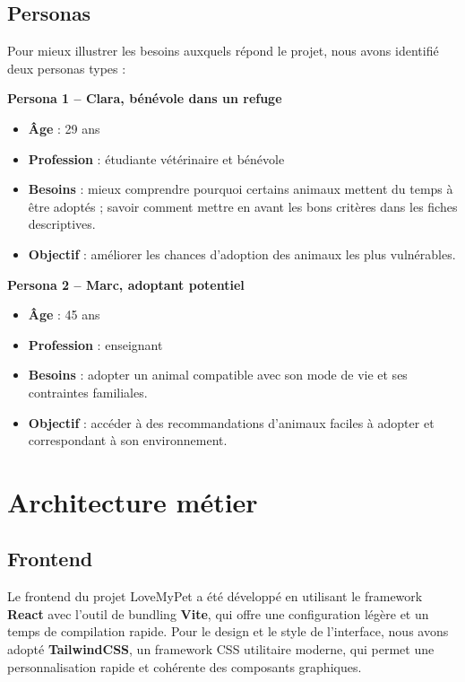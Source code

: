 \documentclass[a4paper,12pt]{article}
\begin{document}
\subsection{Personas}

Pour mieux illustrer les besoins auxquels répond le projet, nous avons identifié deux personas types :

\vspace{1em}
\textbf{Persona 1 – Clara, bénévole dans un refuge}

\begin{itemize}
    \item \textbf{Âge} : 29 ans
    \item \textbf{Profession} : étudiante vétérinaire et bénévole
    \item \textbf{Besoins} : mieux comprendre pourquoi certains animaux mettent du temps à être adoptés ; savoir comment mettre en avant les bons critères dans les fiches descriptives.
    \item \textbf{Objectif} : améliorer les chances d’adoption des animaux les plus vulnérables.
\end{itemize}

\vspace{1em}
\textbf{Persona 2 – Marc, adoptant potentiel}

\begin{itemize}
    \item \textbf{Âge} : 45 ans
    \item \textbf{Profession} : enseignant
    \item \textbf{Besoins} : adopter un animal compatible avec son mode de vie et ses contraintes familiales.
    \item \textbf{Objectif} : accéder à des recommandations d’animaux faciles à adopter et correspondant à son environnement.
\end{itemize}

\section {Architecture métier}

\subsection {Frontend}

Le frontend du projet LoveMyPet a été développé en utilisant le framework \textbf{React} avec l’outil de bundling \textbf{Vite}, qui offre une configuration légère et un temps de compilation rapide. Pour le design et le style de l’interface, nous avons adopté \textbf{TailwindCSS}, un framework CSS utilitaire moderne, qui permet une personnalisation rapide et cohérente des composants graphiques.
\end{document}
